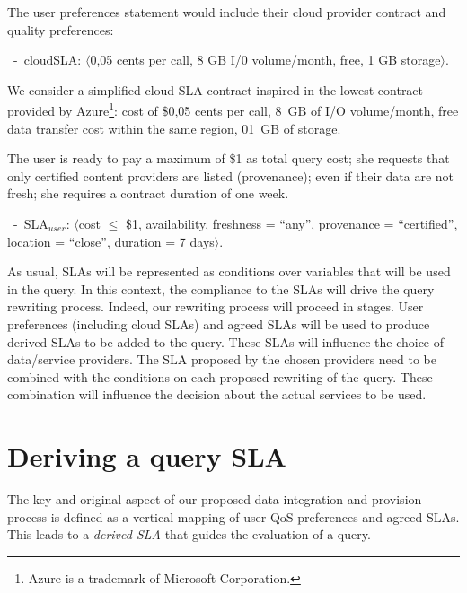 The user preferences statement would include their cloud provider contract and quality preferences:
\begin{trivlist}\sf\footnotesize
\item[~-~cloudSLA:]  $\langle$0,05 cents per call, 8 GB I/0 volume/month, free, 1 GB storage$\rangle$. 
\end{trivlist}

We consider a simplified cloud SLA contract inspired in the lowest contract provided by Azure\footnote{Azure is a trademark of Microsoft Corporation.}: {\sf cost of \$0,05 cents per call,  8~GB of I/O volume/month, free data transfer cost within the same region,  01~GB of storage}. 

The user is ready to pay a maximum of {\sf \$1 as total query cost}; she requests that only {\sf certified} content providers are listed (provenance); even if their data are not fresh; she requires a contract duration of one week.

\begin{trivlist}\sf\footnotesize
\item[~-~SLA$_\mathit{user}$: ] $\langle$cost $\leq$ \$1, availability, freshness = ``any'', provenance = ``certified'', location = ``close'', duration = 7 days$\rangle$. 
\end{trivlist}

As usual, SLAs will be represented as conditions over variables that will be used in the query.
In this context, the compliance to the SLAs will drive the query rewriting process.
Indeed, our rewriting process will proceed in stages.
User preferences (including cloud SLAs) and agreed SLAs will be used to produce derived SLAs to be added to the query. 
These SLAs will influence the choice of data/service providers.
The SLA proposed by the chosen providers need to be combined with the conditions on each proposed rewriting of the query.
These combination will influence the decision about the actual services to be used.

\section{Deriving a query SLA}
\label{sec:slaModel}

The key and original aspect of   our proposed data integration and provision process is  defined as a vertical mapping of user QoS preferences and agreed SLAs. This  leads to a {\em derived SLA} that guides the evaluation of a query. 

